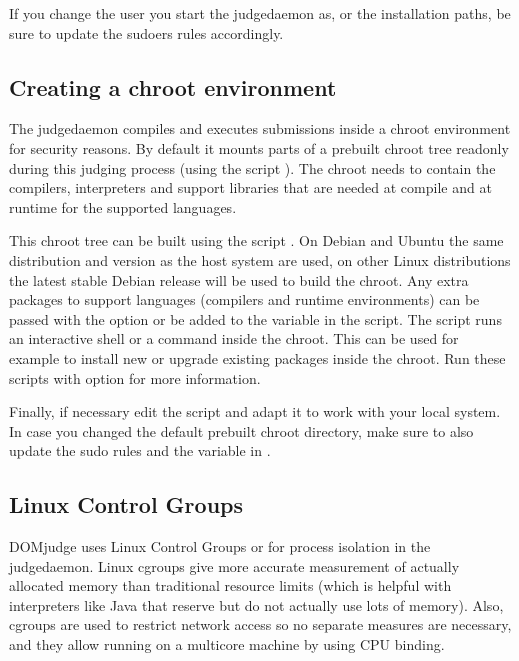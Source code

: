 \documentclass[a4paper,10pt,english,openany]{sphinxmanual}
\begin{document}
\sphinxAtStartPar
If you change the user you start the judgedaemon as, or the installation
paths, be sure to update the sudoers rules accordingly.


\subsection{Creating a chroot environment}
\label{\detokenize{install-judgehost:creating-a-chroot-environment}}\label{\detokenize{install-judgehost:make-chroot}}
\sphinxAtStartPar
The judgedaemon compiles and executes submissions inside a chroot
environment for security reasons. By default it mounts parts of a
prebuilt chroot tree read\sphinxhyphen{}only during this judging process (using
the script ). The chroot needs
to contain the compilers, interpreters and support libraries that
are needed at compile\sphinxhyphen{} and at runtime for the supported languages.

\sphinxAtStartPar
This chroot tree can be built using the script
. On Debian and Ubuntu the same
distribution and version as the host system are used, on other Linux
distributions the latest stable Debian release will be used to build
the chroot. Any extra packages to support languages (compilers and
runtime environments) can be passed with the option  or be
added to the  variable in the script. The script
 runs an interactive shell or a command inside
the chroot. This can be used for example to install new or upgrade
existing packages inside the chroot.
Run these scripts with option  for more information.

\sphinxAtStartPar
Finally, if necessary edit the script 
and adapt it to work with your local system. In case you changed the
default pre\sphinxhyphen{}built chroot directory, make sure to also update the sudo
rules and the  variable in .


\subsection{Linux Control Groups}
\label{\detokenize{install-judgehost:linux-control-groups}}
\sphinxAtStartPar
DOMjudge uses Linux Control Groups or  for process isolation in
the judgedaemon. Linux cgroups give more accurate measurement of
actually allocated memory than traditional resource limits (which is
helpful with interpreters like Java that reserve but do not actually use
lots of memory). Also, cgroups are used to restrict network access so
no separate measures are necessary, and they allow running
{\hyperref[\detokenize{config-advanced:multiple-judgedaemons}]{}}
on a multi\sphinxhyphen{}core machine by using CPU binding.
\end{document}

